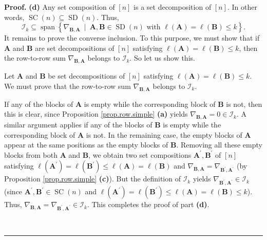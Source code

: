 \documentclass[numbers=enddot,12pt,final,onecolumn,notitlepage]{scrartcl}%
\numberwithin{exer}{subsection}
\theoremstyle{definition}
\newenvironment{proof}[1][Proof]{\noindent\textbf{#1.} }{\ \rule{0.5em}{0.5em}}
\begin{document}
\begin{proof}
\textbf{(d)} Any set composition of $\left[  n\right]  $ is a set
decomposition of $\left[  n\right]  $. In other words, $\operatorname*{SC}%
\left(  n\right)  \subseteq\operatorname*{SD}\left(  n\right)  $. Thus,%
\[
\mathcal{I}_{k}\subseteq\operatorname*{span}\left\{  \nabla_{\mathbf{B}%
,\mathbf{A}}\ \mid\ \mathbf{A},\mathbf{B}\in\operatorname*{SD}\left(
n\right)  \text{ with }\ell\left(  \mathbf{A}\right)  =\ell\left(
\mathbf{B}\right)  \leq k\right\}  .
\]
It remains to prove the converse inclusion. To this purpose, we must show that
if $\mathbf{A}$ and $\mathbf{B}$ are set decompositions of $\left[  n\right]
$ satisfying $\ell\left(  \mathbf{A}\right)  =\ell\left(  \mathbf{B}\right)
\leq k$, then the row-to-row sum $\nabla_{\mathbf{B},\mathbf{A}}$ belongs to
$\mathcal{I}_{k}$. So let us show this.

Let $\mathbf{A}$ and $\mathbf{B}$ be set decompositions of $\left[  n\right]
$ satisfying $\ell\left(  \mathbf{A}\right)  =\ell\left(  \mathbf{B}\right)
\leq k$. We must prove that the row-to-row sum $\nabla_{\mathbf{B},\mathbf{A}%
}$ belongs to $\mathcal{I}_{k}$.

If any of the blocks of $\mathbf{A}$ is empty while the corresponding block of
$\mathbf{B}$ is not, then this is clear, since Proposition
\ref{prop.row.simple} \textbf{(a)} yields $\nabla_{\mathbf{B},\mathbf{A}}%
=0\in\mathcal{I}_{k}$. A similar argument applies if any of the blocks of
$\mathbf{B}$ is empty while the corresponding block of $\mathbf{A}$ is not. In
the remaining case, the empty blocks of $\mathbf{A}$ appear at the same
positions as the empty blocks of $\mathbf{B}$. Removing all these empty blocks
from both $\mathbf{A}$ and $\mathbf{B}$, we obtain two set compositions
$\mathbf{A}^{\prime},\mathbf{B}^{\prime}$ of $\left[  n\right]  $ satisfying
$\ell\left(  \mathbf{A}^{\prime}\right)  =\ell\left(  \mathbf{B}^{\prime
}\right)  \leq\ell\left(  \mathbf{A}\right)  =\ell\left(  \mathbf{B}\right)  $
and $\nabla_{\mathbf{B},\mathbf{A}}=\nabla_{\mathbf{B}^{\prime},\mathbf{A}%
^{\prime}}$ (by Proposition \ref{prop.row.simple} \textbf{(c)}). But the
definition of $\mathcal{I}_{k}$ yields $\nabla_{\mathbf{B}^{\prime}%
,\mathbf{A}^{\prime}}\in\mathcal{I}_{k}$ (since $\mathbf{A}^{\prime
},\mathbf{B}^{\prime}\in\operatorname*{SC}\left(  n\right)  $ and $\ell\left(
\mathbf{A}^{\prime}\right)  =\ell\left(  \mathbf{B}^{\prime}\right)  \leq
\ell\left(  \mathbf{A}\right)  =\ell\left(  \mathbf{B}\right)  \leq k$). Thus,
$\nabla_{\mathbf{B},\mathbf{A}}=\nabla_{\mathbf{B}^{\prime},\mathbf{A}%
^{\prime}}\in\mathcal{I}_{k}$. This completes the proof of part \textbf{(d)}.
\medskip


\end{proof}
\end{document}
